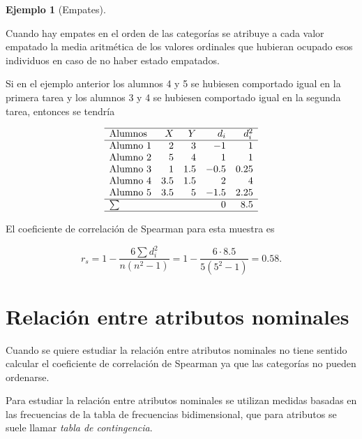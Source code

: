 \documentclass[
  a4paper,
]{scrreport}
\theoremstyle{plain}
\theoremstyle{definition}
\theoremstyle{definition}
\newtheorem{example}{Ejemplo}[chapter]
\theoremstyle{remark}
\begin{document}
\begin{example}[Empates]\protect\hypertarget{exm-coeficiente-correlacion-sperman-empates}{}\label{exm-coeficiente-correlacion-sperman-empates}

Cuando hay empates en el orden de las categorías se atribuye a cada
valor empatado la media aritmética de los valores ordinales que hubieran
ocupado esos individuos en caso de no haber estado empatados.

Si en el ejemplo anterior los alumnos 4 y 5 se hubiesen comportado igual
en la primera tarea y los alumnos 3 y 4 se hubiesen comportado igual en
la segunda tarea, entonces se tendría

\[
\begin{array}{lrrrr}
\hline
\mbox{Alumnos} & X & Y & d_i & d_i^2\\
\hline
\mbox{Alumno 1} & 2 & 3 & -1 & 1\\
\mbox{Alumno 2} & 5 & 4 & 1 & 1 \\
\mbox{Alumno 3} & 1 & 1.5 & -0.5 & 0.25\\
\mbox{Alumno 4} & 3.5 & 1.5 & 2 & 4\\
\mbox{Alumno 5} & 3.5 & 5 & -1.5 & 2.25\\
\hline
\sum &  &  & 0 & 8.5 \\
\hline
\end{array}
\]

El coeficiente de correlación de Spearman para esta muestra es

\[
r_s = 1-\frac{6\sum d_i^2}{n(n^2-1)} = 1- \frac{6\cdot 8.5}{5(5^2-1)} = 0.58.
\]

\end{example}

\section{Relación entre atributos
nominales}\label{relaciuxf3n-entre-atributos-nominales}

Cuando se quiere estudiar la relación entre atributos nominales no tiene
sentido calcular el coeficiente de correlación de Spearman ya que las
categorías no pueden ordenarse.

Para estudiar la relación entre atributos nominales se utilizan medidas
basadas en las frecuencias de la tabla de frecuencias bidimensional, que
para atributos se suele llamar \emph{tabla de contingencia}.
\end{document}
